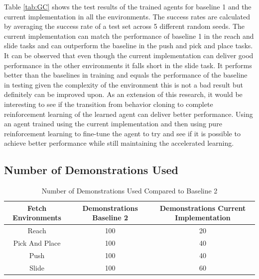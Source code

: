 Table \ref{tab:GC} shows the test results of the trained agents for baseline 1 and the current implementation in all the environments. The success rates are calculated by averaging the success rate of a test set across 5 different random seeds. The current implementation can match the performance of baseline 1 in the reach and slide tasks and can outperform the baseline in the push and pick and place tasks. It can be observed that even though the current implementation can deliver good performance in the other environments it falls short in the slide task. It performs better than the baselines in training and equals the performance of the baseline in testing given the complexity of the environment this is not a bad result but definitely can be improved upon. As an extension of this research, it would be interesting to see if the transition from behavior cloning to complete reinforcement learning of the learned agent can deliver better performance. Using an agent trained using the current implementation and then using pure reinforcement learning to fine-tune the agent to try and see if it is possible to achieve better performance while still maintaining the accelerated learning. \\

\subsection{Number of Demonstrations Used}

\begin{table}[h!]
\begin{tabular}{|c|c|c|}
\hline
Fetch Environments & Demonstrations Baseline 2 & Demonstrations Current Implementation \\ \hline
Reach              & 100                     & 20                                    \\ \hline
Pick And Place     & 100                     & 40                                    \\ \hline
Push               & 100                     & 40                                    \\ \hline
Slide              & 100                     & 60                                    \\ \hline
\end{tabular}
\caption{Number of Demonstrations Used Compared to Baseline 2}
\label{tab:ND}
\end{table}

